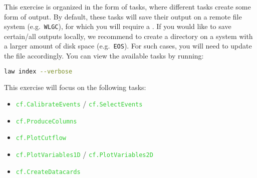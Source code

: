 This exercise is organized in the form of  tasks, where different tasks create some form of output. By default, these tasks will save their output on a remote file system (e.g.\ \texttt{WLGC}), for which you will require a . If you would like to save certain/all outputs locally, we recommend to create a directory on a system with a larger amount of disk space (e.g.\ \texttt{EOS}). For such cases, you will need to update the  file accordingly. You can view the available tasks by running:
\begin{lstlisting}[language=bash]
law index --verbose
\end{lstlisting}

This exercise will focus on the following tasks:

\begin{itemize}
    \item \texttt{\textcolor{LimeGreen}{cf.CalibrateEvents}} / \texttt{\textcolor{LimeGreen}{cf.SelectEvents}}
    \item \texttt{\textcolor{LimeGreen}{cf.ProduceColumns}}
    \item \texttt{\textcolor{LimeGreen}{cf.PlotCutflow}}
    \item \texttt{\textcolor{LimeGreen}{cf.PlotVariables1D}} / \texttt{\textcolor{LimeGreen}{cf.PlotVariables2D}}
    \item \texttt{\textcolor{LimeGreen}{cf.CreateDatacards}}
\end{itemize}



